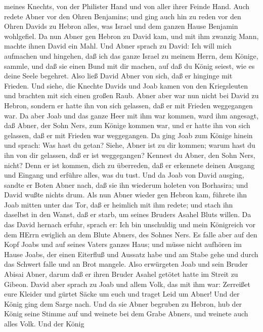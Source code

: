 meines Knechts, von der Philister Hand und von aller ihrer Feinde Hand.
 Auch redete Abner vor den Ohren Benjamins; und ging auch
hin zu reden vor den Ohren Davids zu Hebron alles, was Israel und dem
ganzen Hause Benjamin wohlgefiel.  Da nun Abner gen Hebron
zu David kam, und mit ihm zwanzig Mann, machte ihnen David ein Mahl.
 Und Abner sprach zu David: Ich will mich aufmachen und
hingehen, daß ich das ganze Israel zu meinem Herrn, dem Könige, sammle,
und daß sie einen Bund mit dir machen, auf daß du König seiest, wie es
deine Seele begehret. Also ließ David Abner von sich, daß er hinginge
mit Frieden.  Und siehe, die Knechte Davids und Joab kamen
von den Kriegsleuten und brachten mit sich einen großen Raub. Abner aber
war nun nicht bei David zu Hebron, sondern er hatte ihn von sich
gelassen, daß er mit Frieden weggegangen war.  Da aber Joab
und das ganze Heer mit ihm war kommen, ward ihm angesagt, daß Abner, der
Sohn Ners, zum Könige kommen war, und er hatte ihn von sich gelassen,
daß er mit Frieden war weggegangen.  Da ging Joab zum
Könige hinein und sprach: Was hast du getan? Siehe, Abner ist zu dir
kommen; warum hast du ihn von dir gelassen, daß er ist weggegangen?
 Kennest du Abner, den Sohn Ners, nicht? Denn er ist
kommen, dich zu überreden, daß er erkennete deinen Ausgang und Eingang
und erführe alles, was du tust.  Und da Joab von David
ausging, sandte er Boten Abner nach, daß sie ihn wiederum holeten von
Borhasira; und David wußte nichts drum.  Als nun Abner
wieder gen Hebron kam, führete ihn Joab mitten unter das Tor, daß er
heimlich mit ihm redete; und stach ihn daselbst in den Wanst, daß er
starb, um seines Bruders Asahel Bluts willen.  Da das David
hernach erfuhr, sprach er: Ich bin unschuldig und mein Königreich vor
dem HErrn ewiglich an dem Blute Abners, des Sohnes Ners. 
Es falle aber auf den Kopf Joabs und auf seines Vaters ganzes Haus; und
müsse nicht aufhören im Hause Joabs, der einen Eiterfluß und Aussatz
habe und am Stabe gehe und durch das Schwert falle und an Brot mangele.
 Also erwürgeten Joab und sein Bruder Abisai Abner, darum
daß er ihren Bruder Asahel getötet hatte im Streit zu Gibeon.
 David aber sprach zu Joab und allem Volk, das mit ihm war:
Zerreißet eure Kleider und gürtet Säcke um euch und traget Leid um
Abner! Und der König ging dem Sarge nach.  Und da sie Abner
begruben zu Hebron, hub der König seine Stimme auf und weinete bei dem
Grabe Abners, und weinete auch alles Volk.  Und der König
